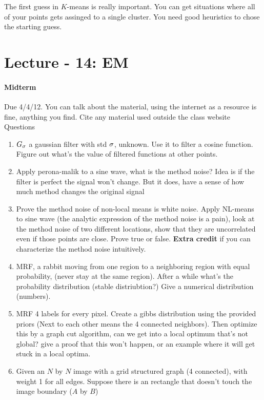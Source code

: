 The first guess in $K$-means is really important. You can get
situations where all of your points gets assinged to a single
cluster. You need good heuristics to chose the starting guess. 

\pagebreak
\section{Lecture - 14: EM}

\paragraph{Midterm} Due 4/4/12.
You can talk about the material, using the internet as a resource is
fine, anything you find. Cite any material used outside the class
website
Questions
\begin{enumerate}
\item $G_\sigma$ a gaussian filter with std $\sigma$, unknown. Use it to filter a
  cosine function. Figure out what's the value of filtered functions
  at other points.
\item Apply perona-malik to a sine wave, what is the method noise?
  Idea is if the filter is perfect the signal won't change. But it
  does, have a sense of how much method changes the original signal
\item Prove the method noise of non-local means is white noise. Apply
  NL-means to sine wave (the analytic expression of the method noise
  is a pain), look at the method noise of two different locations, show
  that they are uncorrelated even if those points are close. Prove
  true or false. \textbf{Extra credit} if you can characterize the method noise
  intuitively. 
\item MRF, a rabbit moving from one region to a neighboring region
  with equal probability, (never stay at the same region). After a
  while what's the probability distribution (stable distriubtion?)
  Give a numerical distribution (numbers).
\item MRF 4 labels for every pixel. Create a gibbs distribution using
  the provided priors (Next
  to each other means the 4 connected neighbors). Then optimize this
  by a graph cut algorithm, can we get into a local optimum that's not
  global? give a proof that this won't happen, or an example where it
  will get stuck in a local optima.
\item Given an $N$ by $N$ image with a grid structured graph (4
  connected), with weight 1 for all edges. Suppose there is an
  rectangle that doesn't touch the image boundary ($A$ by $B$)

\end{enumerate}
